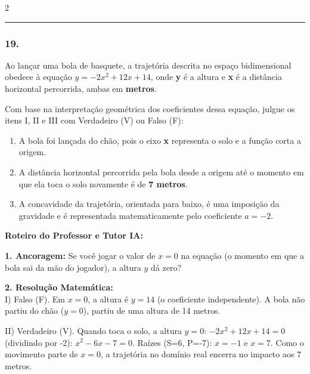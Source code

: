 \begin{multicols*}{2}
\noindent\textcolor{CorLinha}{\rule{\linewidth}{0.5pt}} 
\par\vspace{\espacoPreQuestao}
\subsubsection*{19.} 
\begin{enunciadoLiteral}
Ao lançar uma bola de basquete, a trajetória descrita no espaço bidimensional obedece à equação $y = -2x^2 + 12x + 14$, onde \textbf{y} é a altura e \textbf{x} é a distância horizontal percorrida, ambas em \textbf{metros}.

Com base na interpretação geométrica dos coeficientes dessa equação, julgue os itens I, II e III com Verdadeiro (V) ou Falso (F):

\begin{enumerate}[label=\Roman*.]
    \item A bola foi lançada do chão, pois o eixo \textbf{x} representa o solo e a função corta a origem.
    \item A distância horizontal percorrida pela bola desde a origem até o momento em que ela toca o solo novamente é de \textbf{7 metros}.
    \item A concavidade da trajetória, orientada para baixo, é uma imposição da gravidade e é representada matematicamente pelo coeficiente $a = -2$.
\end{enumerate}
\end{enunciadoLiteral}

\ifgabarito
    \begin{tcolorbox}[colback=CorTitUm!5, colframe=CorTitUm, boxrule=1pt, arc=4pt, left=6pt, right=6pt, top=6pt, bottom=6pt]
    \small\textbf{\textcolor{CorTitUm}{Roteiro do Professor e Tutor IA:}}\par\vspace{0.1cm}
    \color{CinzaEscuro}
    \textbf{1. Ancoragem:} Se você jogar o valor de $x=0$ na equação (o momento em que a bola sai da mão do jogador), a altura $y$ dá zero?\par\vspace{0.1cm}
    \textbf{2. Resolução Matemática:}\\
    I) Falso (F). Em $x=0$, a altura é $y = 14$ (o coeficiente independente). A bola não partiu do chão ($y=0$), partiu de uma altura de 14 metros.
    
    II) Verdadeiro (V). Quando toca o solo, a altura $y=0$: 
    $-2x^2 + 12x + 14 = 0$ (dividindo por -2):
    $x^2 - 6x - 7 = 0$. 
    Raízes (S=6, P=-7): $x=-1$ e $x=7$. 
    Como o movimento parte de $x=0$, a trajetória no domínio real encerra no impacto aos 7 metros.
    

\end{tcolorbox}
\end{multicols*}
